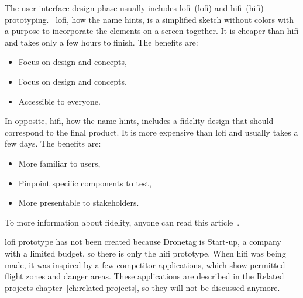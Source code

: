 The user interface design phase usually includes \acrshort{lofi}~(\acrlong{lofi}) and \acrshort{hifi}~(\acrlong{hifi}) prototyping.~\cite{effectivePrototyping}
\acrshort{lofi}, how the name hints, is a simplified sketch without colors with a purpose to incorporate the elements on a screen together.
It is cheaper than \acrshort{hifi} and takes only a few hours to finish.
The benefits are:
\begin{itemize}
    \item Focus on design and concepts,
    \item Focus on design and concepts,
    \item Accessible to everyone.~\cite{hiFiLoFiPrototypeArticle}
\end{itemize}
In opposite, \acrshort{hifi}, how the name hints, includes a fidelity design that should correspond to the final product.
It is more expensive than \acrshort{lofi} and usually takes a few days.
The benefits are:
\begin{itemize}
    \item More familiar to users,
    \item Pinpoint specific components to test,
    \item More presentable to stakeholders.~\cite{hiFiLoFiPrototypeArticle}
\end{itemize}
To more information about fidelity, anyone can read this article~\cite{hiFiLoFiPrototypeArticle}.

\acrshort{lofi} prototype has not been created because Dronetag is Start-up, a company with a limited budget, so there is only the \acrshort{hifi} prototype.
When \acrshort{hifi} was being made, it was inspired by a few competitor applications, which show permitted flight zones and danger areas.
These applications are described in the Related projects chapter~\ref{ch:related-projects}, so they will not be discussed anymore.





